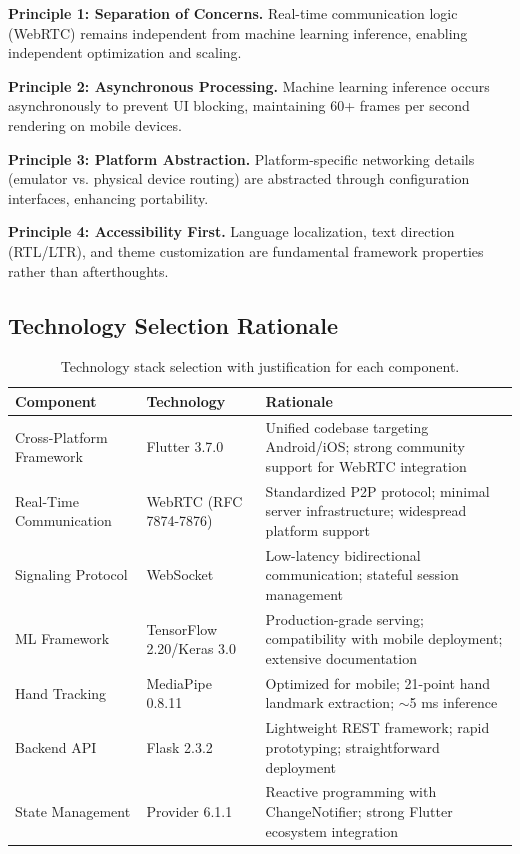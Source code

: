 \documentclass[11pt,a4paper,twoside]{report}
\begin{document}
\textbf{Principle 1: Separation of Concerns.} Real-time communication logic (WebRTC) remains independent from machine learning inference, enabling independent optimization and scaling.

\textbf{Principle 2: Asynchronous Processing.} Machine learning inference occurs asynchronously to prevent UI blocking, maintaining 60+ frames per second rendering on mobile devices.

\textbf{Principle 3: Platform Abstraction.} Platform-specific networking details (emulator vs. physical device routing) are abstracted through configuration interfaces, enhancing portability.

\textbf{Principle 4: Accessibility First.} Language localization, text direction (RTL/LTR), and theme customization are fundamental framework properties rather than afterthoughts.

\subsection{Technology Selection Rationale}
\label{subsec:technology-selection}

\begin{table}[H]
\centering
\caption{Technology stack selection with justification for each component.}
\label{tab:technology-stack}
\begin{tabular}{|l|l|p{4cm}|}
\hline
\textbf{Component} & \textbf{Technology} & \textbf{Rationale} \\
\hline
Cross-Platform Framework & Flutter 3.7.0 & Unified codebase targeting Android/iOS; strong community support for WebRTC integration \\
\hline
Real-Time Communication & WebRTC (RFC 7874-7876) & Standardized P2P protocol; minimal server infrastructure; widespread platform support \\
\hline
Signaling Protocol & WebSocket & Low-latency bidirectional communication; stateful session management \\
\hline
ML Framework & TensorFlow 2.20/Keras 3.0 & Production-grade serving; compatibility with mobile deployment; extensive documentation \\
\hline
Hand Tracking & MediaPipe 0.8.11 & Optimized for mobile; 21-point hand landmark extraction; $\sim$5 ms inference \\
\hline
Backend API & Flask 2.3.2 & Lightweight REST framework; rapid prototyping; straightforward deployment \\
\hline
State Management & Provider 6.1.1 & Reactive programming with ChangeNotifier; strong Flutter ecosystem integration \\
\hline
\end{tabular}
\end{table}
\end{document}
